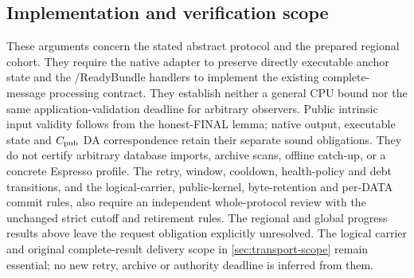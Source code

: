 \subsection{Implementation and verification scope}
\label{sec:v35-progress-scope}
These arguments concern the stated abstract protocol and the prepared
regional cohort. They require the native adapter to preserve directly
executable anchor state and the /ReadyBundle handlers
to implement the existing complete-message processing contract. They
establish neither a general CPU bound nor the same application-validation
deadline for arbitrary observers. Public intrinsic input validity follows
from the honest-FINAL lemma; native output, executable state and
$C_{\rm pub}$ DA correspondence retain their separate sound obligations. They do not certify arbitrary database
imports, archive scans, offline catch-up, or a concrete Espresso profile.
The retry, window, cooldown, health-policy and debt transitions, and
the logical-carrier, public-kernel, byte-retention and per-DATA commit rules, also
require an independent whole-protocol review with the unchanged strict
cutoff and retirement rules. The regional and global progress results
above leave the request obligation explicitly unresolved. The logical carrier and original complete-result delivery scope in
\cref{sec:transport-scope} remain essential; no new retry, archive or
authority deadline is inferred from them.

